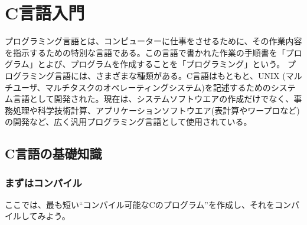 \chapter{C言語入門}

\noindent
プログラミング言語とは、コンピューターに仕事をさせるために、その作業内容を指示するための特別な言語である。この言語で書かれた作業の手順書を「プログラム」とよび、プログラムを作成することを「プログラミング」という。
プログラミング言語には、さまざまな種類がある。C言語はもともと、UNIX (マルチユーザ、マルチタスクのオペレーティングシステム)を記述するためのシステム言語として開発された。現在は、システムソフトウエアの作成だけでなく、事務処理や科学技術計算、アプリケーションソフトウエア(表計算やワープロなど)の開発など、広く汎用プログラミング言語として使用されている。

\section{C言語の基礎知識}
\label{sec:C:basic}
\subsection{まずはコンパイル}

ここでは、最も短い``コンパイル可能なCのプログラム''を作成し、それをコンパイルしてみよう。

